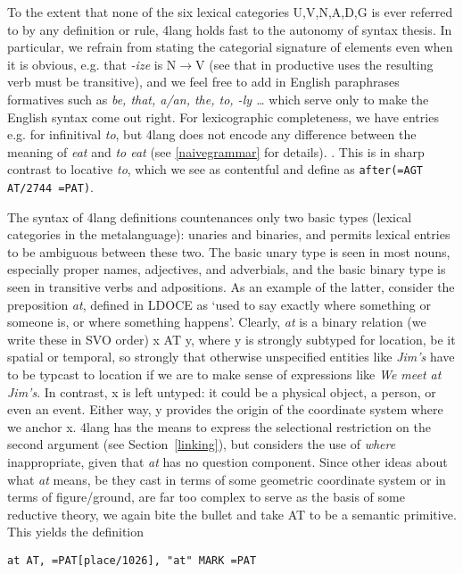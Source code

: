 \documentclass[11pt,bookmarks,bookmarksnumbered,naturalnames,plainpages=false,pdftex,colorlinks=true,urlcolor=blue,bookmarksdepth=subsection,plainpages=false]{paper}
\begin{document}
To the extent that none of the six lexical categories U,V,N,A,D,G is ever
referred to by any definition or rule, 4lang holds fast to the autonomy of
syntax thesis. In particular, we refrain from stating the categorial signature
of elements even when it is obvious, e.g. that {\it -ize} is N$\rightarrow$V
(see \cite{Lieber:1992} that in productive uses the resulting verb must be
transitive), and we feel free to add in English paraphrases formatives such as
{\it be, that, a/an, the, to, -ly \ldots} which serve only to make the English
syntax come out right. For lexicographic completeness, we have entries
e.g. for infinitival {\it to}, but 4lang does not encode any difference
between the meaning of {\it eat} and {\it to eat} (see \ref{naivegrammar} for
details). . This is in sharp contrast to locative {\it to}, which we see as
contentful and define as {\tt after(=AGT AT/2744 =PAT)}.

The syntax of 4lang definitions countenances only two basic types (lexical
categories in the metalanguage): unaries and binaries, and permits lexical
entries to be ambiguous between these two.  The basic unary type is seen in
most nouns, especially proper names, adjectives, and adverbials, and the basic
binary type is seen in transitive verbs and adpositions.  As an example of the
latter, consider the preposition {\it at}, defined in LDOCE as `used to say
exactly where something or someone is, or where something happens'. Clearly,
{\it at} is a binary relation (we write these in SVO order) x AT y, where y is
strongly subtyped for location, be it spatial or temporal, so strongly that
otherwise unspecified entities like {\it Jim's} have to be typcast to location
if we are to make sense of expressions like {\it We meet at Jim's}. In
contrast, x is left untyped: it could be a physical object, a person, or even
an event. Either way, y provides the origin of the coordinate system where we
anchor x. 4lang has the means to express the selectional restriction on the
second argument (see Section~\ref{linking}), but considers the use of {\it
  where} inappropriate, given that {\it at} has no question component. %
Since other ideas about what
{\it at} means, be they cast in terms of some geometric coordinate system or
in terms of figure/ground, are far too complex to serve as the basis of some
reductive theory, we again bite the bullet and take AT to be a semantic
primitive. This yields the definition

\begin{verbatim}
at AT, =PAT[place/1026], "at" MARK =PAT
\end{verbatim}
\end{document}
